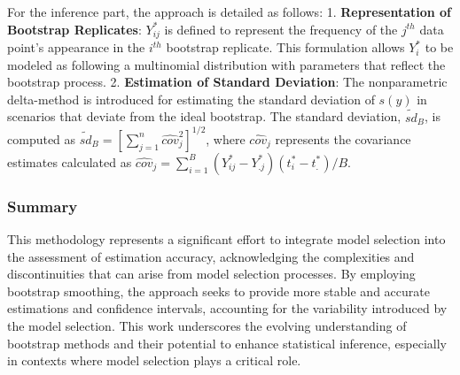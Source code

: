 \documentclass[
]{article}
\begin{document}
For the inference part, the approach is detailed as follows: 1.
\textbf{Representation of Bootstrap Replicates}: \(Y_{ij}^*\) is defined
to represent the frequency of the \(j^{th}\) data point's appearance in
the \(i^{th}\) bootstrap replicate. This formulation allows \(Y_i^*\) to
be modeled as following a multinomial distribution with parameters that
reflect the bootstrap process. 2. \textbf{Estimation of Standard
Deviation}: The nonparametric delta-method is introduced for estimating
the standard deviation of \(s(y)\) in scenarios that deviate from the
ideal bootstrap. The standard deviation, \(\tilde{sd}_B\), is computed
as \(\tilde{sd}_B = [\sum_{j=1}^n\hat{cov}_j^2]^{1/2}\), where
\(\hat{cov}_j\) represents the covariance estimates calculated as
\(\hat{cov}_j = \sum_{i=1}^B(Y_{ij}^*-Y_{.j}^*)(t_i^*-t_.^*)/B\).

\hypertarget{summary}{%
\subsubsection{Summary}\label{summary}}

This methodology represents a significant effort to integrate model
selection into the assessment of estimation accuracy, acknowledging the
complexities and discontinuities that can arise from model selection
processes. By employing bootstrap smoothing, the approach seeks to
provide more stable and accurate estimations and confidence intervals,
accounting for the variability introduced by the model selection. This
work underscores the evolving understanding of bootstrap methods and
their potential to enhance statistical inference, especially in contexts
where model selection plays a critical role.
\end{document}
